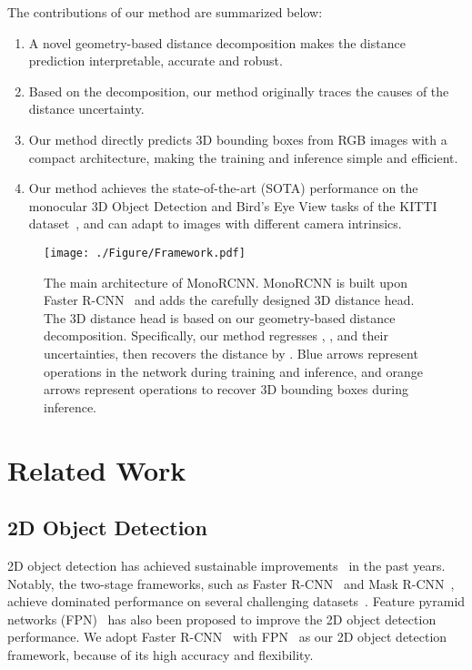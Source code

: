 \documentclass[10pt,twocolumn,letterpaper]{article}
\begin{document}
The contributions of our method are summarized below:
\begin{enumerate}
\item A novel geometry-based distance decomposition makes the distance prediction interpretable, accurate and robust.
\item Based on the decomposition, our method originally traces the causes of the distance uncertainty.
\item Our method directly predicts 3D bounding boxes from RGB images with a compact architecture, making the training and inference simple and efficient.
\item Our method achieves the state-of-the-art (SOTA) performance on the monocular 3D Object Detection and Bird’s Eye View tasks of the KITTI dataset~\cite{DBLP:conf/cvpr/GeigerLU12}, and can adapt to images with different camera intrinsics.
\end{enumerate} \begin{figure*}
\centering
\texttt{[image: ./Figure/Framework.pdf]}
\caption{The main architecture of MonoRCNN. MonoRCNN is built upon Faster R-CNN~\cite{DBLP:conf/nips/RenHGS15} and adds the carefully designed 3D distance head. The 3D distance head is based on our geometry-based distance decomposition. Specifically, our method regresses , , and their uncertainties, then recovers the distance by .  \textcolor[RGB]{100,149,237}{Blue} arrows represent operations in the network during training and inference, and \textcolor[RGB]{255,165,0}{orange} arrows represent operations to recover 3D bounding boxes during inference.
}
\label{fig:Framework}
\end{figure*}

\section{Related Work}

\subsection{2D Object Detection}
2D object detection has achieved sustainable improvements~\cite{DBLP:conf/cvpr/GirshickDDM14,DBLP:conf/iccv/Girshick15,DBLP:conf/nips/RenHGS15,DBLP:conf/eccv/LiuAESRFB16,DBLP:conf/iccv/LinGGHD17,DBLP:conf/cvpr/LinDGHHB17} in the past years. Notably, the two-stage frameworks, such as Faster R-CNN~\cite{DBLP:conf/nips/RenHGS15} and Mask R-CNN~\cite{DBLP:conf/iccv/HeGDG17}, achieve dominated performance on several challenging datasets~\cite{DBLP:conf/eccv/LinMBHPRDZ14,DBLP:conf/cvpr/GeigerLU12}. Feature pyramid networks (FPN)~\cite{DBLP:conf/cvpr/LinDGHHB17} has also been proposed to improve the 2D object detection performance. We adopt Faster R-CNN~\cite{DBLP:conf/nips/RenHGS15} with FPN~\cite{DBLP:conf/cvpr/LinDGHHB17} as our 2D object detection framework, because of its high accuracy and flexibility. 
\end{document}
